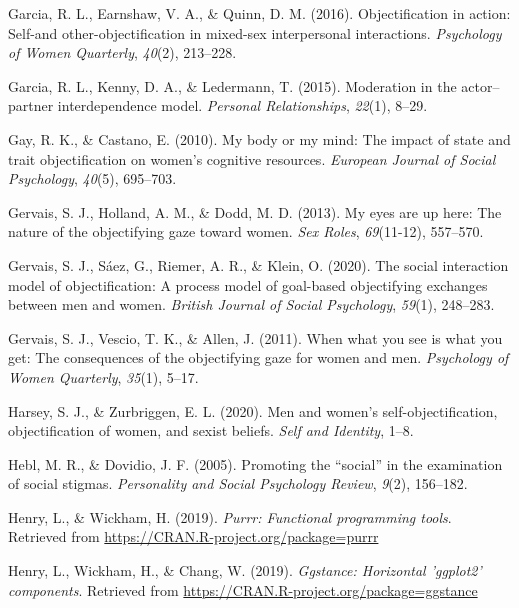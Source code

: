 \documentclass[
  man]{apa6}
\begin{document}
\leavevmode\hypertarget{ref-garcia2016objectification}{}%
Garcia, R. L., Earnshaw, V. A., \& Quinn, D. M. (2016). Objectification in action: Self-and other-objectification in mixed-sex interpersonal interactions. \emph{Psychology of Women Quarterly}, \emph{40}(2), 213--228.

\leavevmode\hypertarget{ref-garcia2015moderation}{}%
Garcia, R. L., Kenny, D. A., \& Ledermann, T. (2015). Moderation in the actor--partner interdependence model. \emph{Personal Relationships}, \emph{22}(1), 8--29.

\leavevmode\hypertarget{ref-gay2010my}{}%
Gay, R. K., \& Castano, E. (2010). My body or my mind: The impact of state and trait objectification on women's cognitive resources. \emph{European Journal of Social Psychology}, \emph{40}(5), 695--703.

\leavevmode\hypertarget{ref-gervais2013my}{}%
Gervais, S. J., Holland, A. M., \& Dodd, M. D. (2013). My eyes are up here: The nature of the objectifying gaze toward women. \emph{Sex Roles}, \emph{69}(11-12), 557--570.

\leavevmode\hypertarget{ref-gervais2020social}{}%
Gervais, S. J., Sáez, G., Riemer, A. R., \& Klein, O. (2020). The social interaction model of objectification: A process model of goal-based objectifying exchanges between men and women. \emph{British Journal of Social Psychology}, \emph{59}(1), 248--283.

\leavevmode\hypertarget{ref-gervais2011you}{}%
Gervais, S. J., Vescio, T. K., \& Allen, J. (2011). When what you see is what you get: The consequences of the objectifying gaze for women and men. \emph{Psychology of Women Quarterly}, \emph{35}(1), 5--17.

\leavevmode\hypertarget{ref-harsey2020men}{}%
Harsey, S. J., \& Zurbriggen, E. L. (2020). Men and women's self-objectification, objectification of women, and sexist beliefs. \emph{Self and Identity}, 1--8.

\leavevmode\hypertarget{ref-hebl2005promoting}{}%
Hebl, M. R., \& Dovidio, J. F. (2005). Promoting the ``social'' in the examination of social stigmas. \emph{Personality and Social Psychology Review}, \emph{9}(2), 156--182.

\leavevmode\hypertarget{ref-R-purrr}{}%
Henry, L., \& Wickham, H. (2019). \emph{Purrr: Functional programming tools}. Retrieved from \url{https://CRAN.R-project.org/package=purrr}

\leavevmode\hypertarget{ref-R-ggstance}{}%
Henry, L., Wickham, H., \& Chang, W. (2019). \emph{Ggstance: Horizontal 'ggplot2' components}. Retrieved from \url{https://CRAN.R-project.org/package=ggstance}
\end{document}
